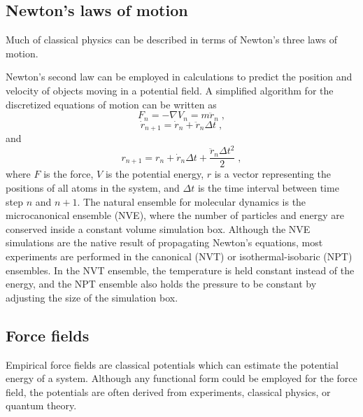 \documentclass[12pt]{report}
\begin{document}
\subsection{Newton's laws of motion}

Much of classical physics can be described in terms of Newton's three laws of
motion.
\begin{quote}
\end{quote}
Newton's second law can be employed in calculations to predict the position
and velocity of objects moving in a potential field. A simplified algorithm
for the discretized equations of motion can be written as
\begin{equation}
 F_{n} = -\nabla V_{n} = m\ddot r_{n} \; ,
\end{equation}
\begin{equation}
 \dot r_{n+1} = \dot r_{n}+\ddot r_{n}\Delta t \; ,
\end{equation}
and
\begin{equation}
 r_{n+1} = r_{n}+\dot r_{n}\Delta t+\frac{\ddot r_{n}\Delta t^2}{2} \; ,
\end{equation}
where $F$ is the force, $V$ is the potential energy, $r$ is a vector
representing the positions of all atoms in the system, and $\Delta t$ is the
time interval between time step $n$ and $n+1$. The natural ensemble for
molecular dynamics is the microcanonical ensemble (NVE), where the number of
particles and energy are conserved inside a constant volume simulation box.
Although the NVE simulations are the native result of propagating Newton's
equations, most experiments are performed in the canonical (NVT) or
isothermal-isobaric (NPT) ensembles. In the NVT ensemble, the temperature is
held constant instead of the energy, and the NPT ensemble also holds the
pressure to be constant by adjusting the size of the simulation box.

\subsection{Force fields}

Empirical force fields are classical potentials which can estimate the
potential energy of a system. Although any functional form could be employed
for the force field, the potentials are often derived from experiments,
classical physics, or quantum theory. \\
\end{document}
